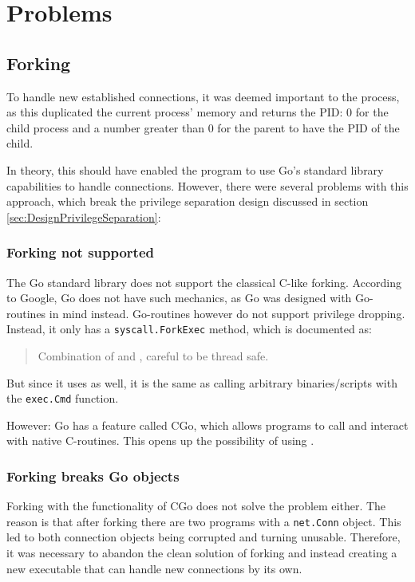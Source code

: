 \documentclass[10pt,a4paper,titlepage,twoside,english,final]{zhawreprt}
\begin{document}
\section{Problems}\label{sec:Problems}
\subsection{Forking}\label{ssec:Forking}
To handle new established connections, it was deemed important to \cite{fork} the process, as this duplicated the current process' memory and returns the \gls{PID}:
0 for the child process and a number greater than 0 for the parent to have the \gls{PID} of the child.

In theory, this should have enabled the program to use \gls{Go}'s standard library capabilities to handle connections.
However, there were several problems with this approach, which break the privilege separation design discussed in section \ref{sec:DesignPrivilegeSeparation}:

\subsubsection{Forking not supported}\label{sssec:ForkingNotSupported}
The \gls{Go} standard library does not support the classical \gls{C}-like forking.
According to Google, \gls{Go} does not have such mechanics, as \gls{Go} was designed with \gls{Go}-routines in mind instead.
\gls{Go}-routines however do not support privilege dropping.
Instead, it only has a \texttt{syscall.ForkExec} method, which is documented as:
\begin{quote}
Combination of \cite{fork} and \cite{exec}, careful to be thread safe.
\end{quote}
But since it uses \cite{exec} as well, it is the same as calling arbitrary binaries/scripts with the \texttt{exec.Cmd} function.

However: \gls{Go} has a feature called \gls{CGo}, which allows programs to call and interact with native \gls{C}-routines.
This opens up the possibility of using \cite{fork}.

\subsubsection{Forking breaks Go objects}\label{sssec:ForkingBreaksGoObjects}
Forking with the functionality of \gls{CGo} does not solve the problem either.
The reason is that after forking there are two programs with a \texttt{net.Conn} object.
This led to both connection objects being corrupted and turning unusable.
Therefore, it was necessary to abandon the clean solution of forking and instead creating a new executable that can handle new connections by its own.
\end{document}
